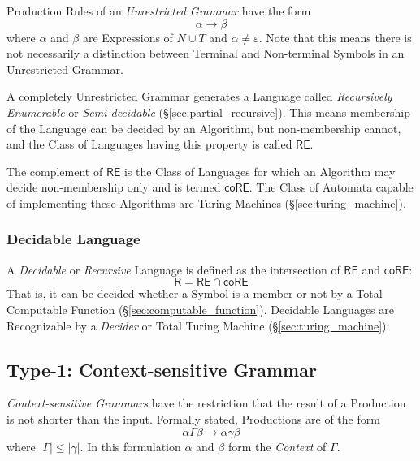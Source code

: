Production Rules of an \emph{Unrestricted Grammar} have the form
\[
  \alpha \rightarrow \beta
\]
where $\alpha$ and $\beta$ are Expressions of $N \cup T$ and $\alpha
\neq \varepsilon$. Note that this means there is not necessarily a
distinction between Terminal and Non-terminal Symbols in an
Unrestricted Grammar.

A completely Unrestricted Grammar generates a Language called
\emph{Recursively Enumerable} or \emph{Semi-decidable}
(\S\ref{sec:partial_recursive}). This means membership of the Language
can be decided by an Algorithm, but non-membership cannot, and the
Class of Languages having this property is called $\mathsf{RE}$.

The complement of $\mathsf{RE}$ is the Class of Languages for which an
Algorithm may decide non-membership only and is termed
$\mathsf{coRE}$. The Class of Automata capable of implementing these
Algorithms are Turing Machines (\S\ref{sec:turing_machine}).



\subsubsection{Decidable Language}\label{sec:decidable_language}

A \emph{Decidable} or \emph{Recursive} Language is defined as the
intersection of $\mathsf{RE}$ and $\mathsf{coRE}$:
\[
  \mathsf{R} = \mathsf{RE} \cap \mathsf{coRE}
\]
That is, it can be decided whether a Symbol is a member or not by a
Total Computable Function (\S\ref{sec:computable_function}). Decidable
Languages are Recognizable by a \emph{Decider} or Total Turing Machine
(\S\ref{sec:turing_machine}).\cite{kozen97}



\subsection{Type-1: Context-sensitive Grammar}
\label{sec:context_sensitive}

\emph{Context-sensitive Grammars} have the restriction that the result
of a Production is not shorter than the input. Formally stated,
Productions are of the form
\[
  \alpha \Gamma \beta \rightarrow \alpha \gamma \beta
\]
where $|\Gamma| \leq |\gamma|$. In this formulation $\alpha$ and
$\beta$ form the \emph{Context} of $\Gamma$.

